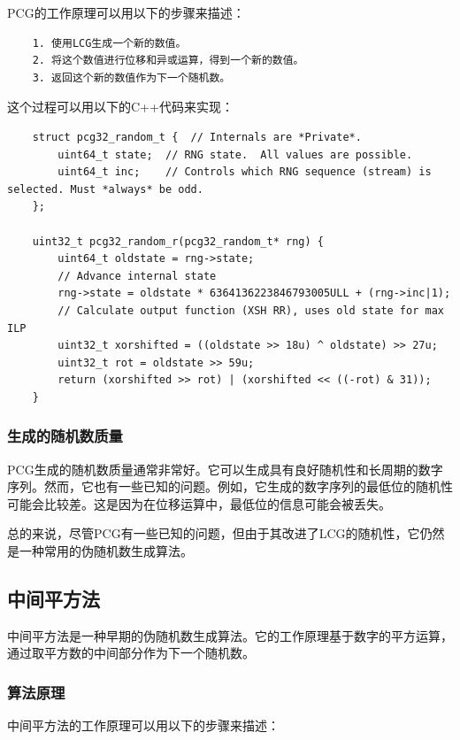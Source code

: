 \documentclass{ctexart}
\begin{document}
    PCG的工作原理可以用以下的步骤来描述：

    \begin{lstlisting}
    1. 使用LCG生成一个新的数值。
    2. 将这个数值进行位移和异或运算，得到一个新的数值。
    3. 返回这个新的数值作为下一个随机数。
    \end{lstlisting}

    这个过程可以用以下的C++代码来实现：

    \begin{lstlisting}
    struct pcg32_random_t {  // Internals are *Private*.
        uint64_t state;  // RNG state.  All values are possible.
        uint64_t inc;    // Controls which RNG sequence (stream) is selected. Must *always* be odd.
    };

    uint32_t pcg32_random_r(pcg32_random_t* rng) {
        uint64_t oldstate = rng->state;
        // Advance internal state
        rng->state = oldstate * 6364136223846793005ULL + (rng->inc|1);
        // Calculate output function (XSH RR), uses old state for max ILP
        uint32_t xorshifted = ((oldstate >> 18u) ^ oldstate) >> 27u;
        uint32_t rot = oldstate >> 59u;
        return (xorshifted >> rot) | (xorshifted << ((-rot) & 31));
    }
    \end{lstlisting}

    \subsubsection{生成的随机数质量}

    PCG生成的随机数质量通常非常好。它可以生成具有良好随机性和长周期的数字序列。然而，它也有一些已知的问题。例如，它生成的数字序列的最低位的随机性可能会比较差。这是因为在位移运算中，最低位的信息可能会被丢失。

    总的来说，尽管PCG有一些已知的问题，但由于其改进了LCG的随机性，它仍然是一种常用的伪随机数生成算法。
    \subsection{中间平方法}

    中间平方法是一种早期的伪随机数生成算法。它的工作原理基于数字的平方运算，通过取平方数的中间部分作为下一个随机数。

    \subsubsection{算法原理}

    中间平方法的工作原理可以用以下的步骤来描述：
\end{document}
